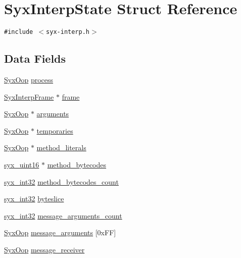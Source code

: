 \hypertarget{struct_syx_interp_state}{
\section{SyxInterpState Struct Reference}
\label{struct_syx_interp_state}
}
{\tt \#include $<$syx-interp.h$>$}

\subsection*{Data Fields}
\begin{CompactItemize}
\item 
\hyperlink{syx-types_8h_1121caba2d40b2ce090b640762744ccd}{SyxOop} \hyperlink{struct_syx_interp_state_b09c376de8773f23719ee7545770c631}{process}
\item 
\hyperlink{struct_syx_interp_frame}{SyxInterpFrame} $\ast$ \hyperlink{struct_syx_interp_state_9b12d244885322068035a55236f27a37}{frame}
\item 
\hyperlink{syx-types_8h_1121caba2d40b2ce090b640762744ccd}{SyxOop} $\ast$ \hyperlink{struct_syx_interp_state_21f99ebbaf71603731cf037118c8c13d}{arguments}
\item 
\hyperlink{syx-types_8h_1121caba2d40b2ce090b640762744ccd}{SyxOop} $\ast$ \hyperlink{struct_syx_interp_state_eafb29afefa1d6ff179eb668e4ff5759}{temporaries}
\item 
\hyperlink{syx-types_8h_1121caba2d40b2ce090b640762744ccd}{SyxOop} $\ast$ \hyperlink{struct_syx_interp_state_dfb509f8e062636815ea466b4af1524e}{method\_\-literals}
\item 
\hyperlink{syx-types_8h_5c0caeeeb45b4575061ab7f368f10337}{syx\_\-uint16} $\ast$ \hyperlink{struct_syx_interp_state_b33dbca8378dfa3df5a770d07e1c206f}{method\_\-bytecodes}
\item 
\hyperlink{syx-types_8h_9f31c17555a2dfcf25da84b5c4a2e55b}{syx\_\-int32} \hyperlink{struct_syx_interp_state_0c12712f19d50177cd7ace06975da5cd}{method\_\-bytecodes\_\-count}
\item 
\hyperlink{syx-types_8h_9f31c17555a2dfcf25da84b5c4a2e55b}{syx\_\-int32} \hyperlink{struct_syx_interp_state_91e90bd79f62f35a5746aef791506acb}{byteslice}
\item 
\hyperlink{syx-types_8h_9f31c17555a2dfcf25da84b5c4a2e55b}{syx\_\-int32} \hyperlink{struct_syx_interp_state_4ae56ccb657af2c4933b3ee8353b071e}{message\_\-arguments\_\-count}
\item 
\hyperlink{syx-types_8h_1121caba2d40b2ce090b640762744ccd}{SyxOop} \hyperlink{struct_syx_interp_state_7f74dc0eca9d27cc7fc5aa7e2a7d3e20}{message\_\-arguments} \mbox{[}0xFF\mbox{]}
\item 
\hyperlink{syx-types_8h_1121caba2d40b2ce090b640762744ccd}{SyxOop} \hyperlink{struct_syx_interp_state_d5b8d2093857c4a4d0fa5493ea3d2f25}{message\_\-receiver}
\end{CompactItemize}


